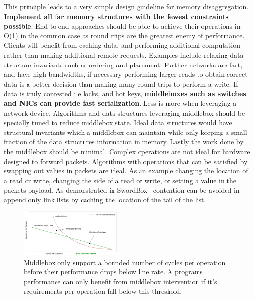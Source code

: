 This principle leads to a very simple design guideline for memory
disaggregation. \textbf{Implement all far memory structures with the fewest
constraints possible}. End-to-end approaches should be able to achieve their
operations in O(1) in the common case as round trips are the greatest enemy of
performance.  Clients will benefit from caching data, and performing additional
computation rather than making additional remote requests. Examples include
relaxing data structure invariants such as ordering and placement. Further
networks are fast, and have high bandwidths, if necessary performing larger
reads to obtain correct data is a better decision than making many round trips
to perform a write. If data is truly contested i.e locks, and hot keys,
\textbf{middleboxes such as switches and NICs can provide fast serialization}.
Less is more when leveraging a network device. Algorithms and data structures
leveraging middlebox should be specially tuned to reduce middlebox state. Ideal
data structures would have structural invariants which a middlebox can maintain
while only keeping a small fraction of the data structures information in
memory. Lastly the work done by the middlebox should be minimal. Complex
operations are not ideal for hardware designed to forward packets. Algorithms
with operations that can be satisfied by swapping out values in packets are
ideal. As an example changing the location of a read or write, changing the side
of a read or write, or setting a value in the packets payload. As demonstrated
in SwordBox~\cite{Grant2021InContRes} contention can be avoided in append only
link lists by caching the location of the tail of the list.

\begin{figure}
    \includegraphics[width=0.45\textwidth]{fig/middlebox_model.png}

    \caption{Middlebox only support a bounded number of cycles per operation
    before their performance drops below line rate. A programs performance can
    only benefit from middlebox intervention if it's requirements per operation
    fall below this threshold.}

    \label{fig:middlebox_model}
\end{figure}

